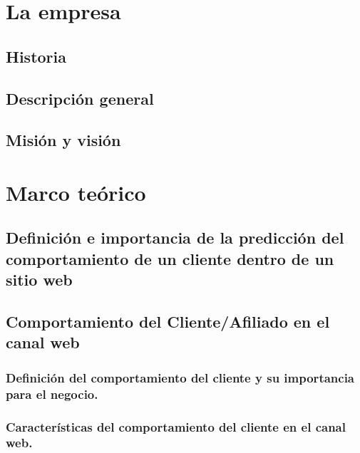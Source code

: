 \documentclass{report}
\begin{document}
\chapter{La empresa}
\newpage

\section{Historia}


\section{Descripción general}


\section{Misión y visión}


\chapter{Marco teórico}
\newpage

\section{Definición e importancia de la predicción del comportamiento de un cliente dentro de un sitio web }


\section{Comportamiento del Cliente/Afiliado en el canal web}

\subsection{Definición del comportamiento del cliente y su importancia para el negocio.}


\subsection{Características del comportamiento del cliente en el canal web.}

\end{document}
